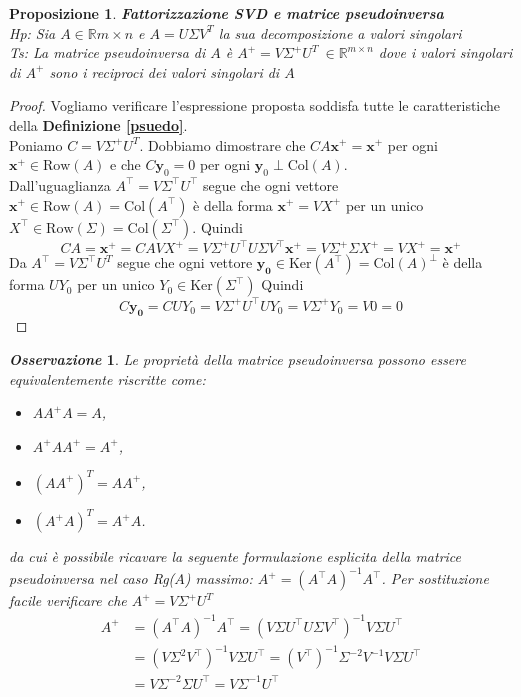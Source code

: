 \documentclass[11pt]{article}
\newtheorem{proposition}{Proposizione}
\newtheorem{oss}{\textit{Osservazione}}
\newcommand{\R}{\mathbb{R}}
\begin{document}
\begin{proposition}
\textbf{Fattorizzazione SVD e matrice pseudoinversa}\\
\textit{Hp:} Sia $A \in \R{m \times n}$ e $A=U\Sigma V^T$ la sua decomposizione a valori singolari\\
\textit{Ts:} La matrice pseudoinversa di $A$ è $A^+=V\Sigma^+U^T \ \in \R^{m \times n}$ dove i valori singolari di $A^+$ sono i reciproci dei valori singolari di $A$ 
\end{proposition}
\begin{proof}
Vogliamo verificare l'espressione proposta soddisfa tutte le caratteristiche della \textbf{Definizione \ref{psuedo}}.\\
Poniamo $C=V\Sigma^+U^T$. Dobbiamo dimostrare che $CA\mathbf{x}^+=\mathbf{x}^+$ per ogni $\mathbf{x}^+ \in \text{Row}(A)$ e che $C\mathbf{y}_0=0$ per ogni $\mathbf{y}_0 \perp \text{Col}(A)$.\\
Dall'uguaglianza $A^\top = V\Sigma^\top U^\top$ segue che ogni vettore $\mathbf{x}^+ \in \text{Row}(A)=\text{Col}(A^\top)$ è della forma $\mathbf{x}^+ = V X^+$ per un unico $X^\top \in \text{Row}(\Sigma)=\text{Col}(\Sigma^\top)$. Quindi\\
$$CA=\mathbf{x}^+ = CAVX^+ = V \Sigma^+ U^\top U \Sigma V^\top \mathbf{x}^+ = V \Sigma^+ \Sigma X^+ = V X^+ = \mathbf{x}^+ $$   
Da $A^\top = V\Sigma^\top U^T $ segue che ogni vettore $ \mathbf{y_0} \in \text{Ker}(A^\top)=\text{Col}(A)^\perp$ è della forma $U Y_0$ per un unico $Y_0 \in \text{Ker}(\Sigma^\top)$ Quindi
$$ C\mathbf{y_0} = CUY_0 = V\Sigma^+ U^\top U Y_0= V \Sigma^+ Y_0 = V0=0 $$
\end{proof}
\noindent
\begin{oss}\label{equiv} Le proprietà della matrice pseudoinversa possono essere equivalentemente riscritte come:
\begin{itemize}
    \item $AA^+A=A$,
    \item $A^+AA^+=A^+$,
    \item $(AA^+)^T=AA^+$,
    \item $(A^+A)^T=A^+A$.
\end{itemize}
\noindent
da cui è possibile ricavare la seguente formulazione esplicita della matrice pseudoinversa nel caso Rg($A$) massimo: $A^+ = (A^\top A)^{-1} A^\top$. Per sostituzione facile verificare che  $A^+=V\Sigma^+U^T$ 
\begin{align*}
A^+ &= (A^ \top A)^{-1}A^ \top  =(V\Sigma U^ \top U\Sigma V^ \top )^{-1} V\Sigma U^ \top  \\
    &=(V\Sigma^2 V^ \top )^{-1} V\Sigma U^ \top  =(V^ \top )^{-1} \Sigma^{-2} V^{-1} V\Sigma U^ \top  \\
    &= V \Sigma^{-2}\Sigma U^ \top  = V\Sigma^{-1}U^ \top 
\end{align*}
\end{oss}
\end{document}

